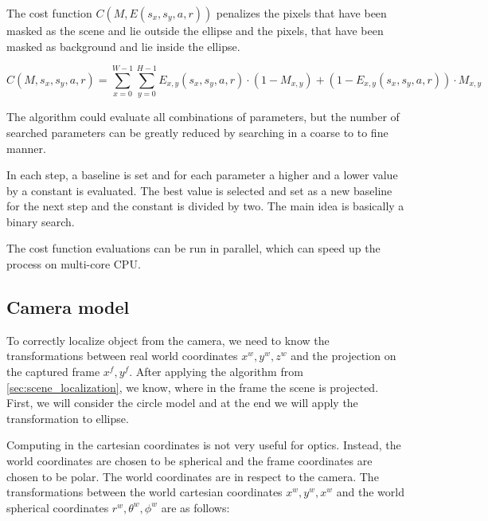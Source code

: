 \documentclass[a4paper,12pt,titlepage, twoside]{article}
\numberwithin{figure}{section}
\begin{document}
The cost function $C(M, E(s_x, s_y, a, r))$ penalizes the pixels that have been masked as the scene and lie outside the ellipse and the pixels, that have been masked as background and lie inside the ellipse.

\begin{equation}
C(M, s_x, s_y, a, r) = \sum_{x = 0}^{W-1} \sum_{y = 0}^{H-1} E_{x,y}(s_x, s_y, a, r) \cdot (1-M_{x,y}) + (1 - E_{x,y}(s_x, s_y, a, r)) \cdot M_{x,y}
\end{equation}

The algorithm could evaluate all combinations of parameters, but the number of searched parameters can be greatly reduced by searching in a coarse to to fine manner. 

In each step, a baseline is set and for each parameter a higher and a lower value by a constant is evaluated. The best value is selected and set as a new baseline for the next step and the constant is divided by two. The main idea is basically a binary search.


%
%
%    
%    
%    

The cost function evaluations can be run in parallel, which can speed up the process on multi-core CPU.

\subsection{Camera model}

To correctly localize object from the camera, we need to know the transformations between real world coordinates $x^w, y^w, z^w$ and the projection on the captured frame $x^f, y^f$. After applying the algorithm from \ref{sec:scene_localization}, we know, where in the frame the scene is projected. First, we will consider the circle model and at the end we will apply the transformation to ellipse. 

Computing in the cartesian coordinates is not very useful for optics. Instead, the world coordinates are chosen to be spherical and the frame coordinates are chosen to be polar. The world coordinates are in respect to the camera. 
The transformations between the world cartesian coordinates $x^w, y^w, x^w$ and the world spherical coordinates $r^w, \theta^w, \phi^w$ are as follows:
\end{document}
